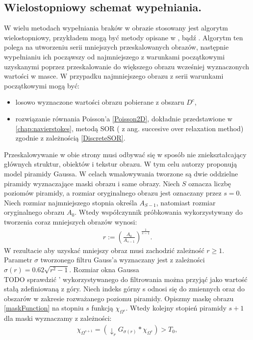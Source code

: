 \documentclass[12pt, twoside, openany]{report}
\theoremstyle{definition}
\begin{document}
\subsection{Wielostopniowy schemat wypełniania.}
W wielu metodach wypełniania braków w obrazie stosowany jest algorytm wielostopniowy, przykładem mogą być metody opisane w \cite{kawai2009image}, \cite{komodakis2007image} bądź \cite{wexler2007space}. Algorytm ten polega na utworzeniu serii mniejszych przeskalowanych obrazów, następnie wypełnianiu ich począwszy od najmniejszego z warunkami początkowymi uzyskanymi poprzez przeskalowanie do większego obrazu wcześniej wyznaczonych wartości w masce. W przypadku najmniejszego obrazu z serii warunkami początkowymi mogą być:
\begin{itemize}
\item
losowo wyznaczone wartości obrazu pobierane z obszaru $D^c$,
\item
rozwiązanie równania Poisson'a \eqref{Poisson2D}, dokładnie przedstawione w \autoref{chap:navierstokes}, metodą SOR ( z ang. succesive over relaxation method) zgodnie z zależnością \eqref{DiscreteSOR}.
\end{itemize}
Przeskalowywanie w obie strony musi odbywać się w sposób nie zniekształcający głównych struktur, obiektów i tekstur obrazu. W tym celu autorzy \cite{arias2011variational} proponują model piramidy Gaussa. W celach wmalowywania tworzone są dwie oddzielne piramidy wyznaczające maski obrazu i same obrazy. Niech $S$ oznacza liczbę poziomów piramidy, a rozmiar oryginalnego obrazu jest oznaczany przez $s=0$. Niech rozmiar najmniejszego stopnia określa $A_{S-1}$, natomiast rozmiar oryginalnego obrazu $A_{0}$. Wtedy współczynnik próbkowania wykorzystywany do tworzenia coraz mniejszych obrazów wynosi:
\begin{align}
r := \left(\frac{A_0}{A_{s-1}}\right)^\frac{1}{s-1}.
\end{align}
W rezultacie aby uzyskać mniejszy obraz musi zachodzić zależność $r \geq 1$. Parametr $\sigma$ tworzonego filtru Gauss'a wyznaczany jest z zależności $\sigma(r)=0.62\sqrt{r^2-1}$. Rozmiar okna Gaussa \\TODO sprawdzić ' wykorzystywanego do filtrowania można przyjąć jako wartość stałą zdefiniowaną z góry. Niech indeks górny s odnosi się do zmiennych oraz do obszarów w zakresie rozważanego poziomu piramidy. Opiszmy maskę obrazu \eqref{maskFunction} na stopniu $s$ funkcją $\chi_{\Omega^{s}}$. Wtedy kolejny stopień piramidy $s+1$ dla maski  wyznaczamy z zależności:
\begin{align}
\chi_{\Omega^{s+1}}=(\downarrow_r G_{\sigma(r)} \ast \chi_{\Omega^s}) > T_{0},
\end{align}
\end{document}
